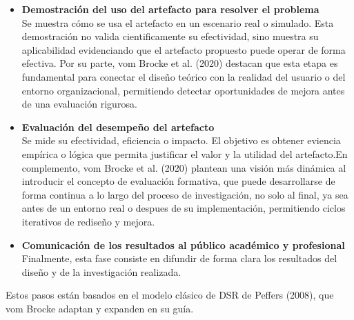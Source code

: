 \begin{itemize}[align=left, label=--]
    \item \textbf{Demostración del uso del artefacto para resolver el problema}\\
    Se muestra cómo se usa el artefacto en un escenario real o simulado. Esta demostración no valida cientificamente su efectividad, sino muestra su aplicabilidad evidenciando que el artefacto propuesto puede operar de forma efectiva. 
    Por su parte, vom Brocke et al. (2020) destacan que esta etapa es fundamental para conectar el diseño teórico con la realidad del usuario o del entorno organizacional, permitiendo detectar oportunidades de mejora antes de una evaluación rigurosa.
    \item \textbf{Evaluación del desempeño del artefacto}\\
    Se mide su efectividad, eficiencia o impacto. El objetivo es obtener eviencia empírica o lógica que permita justificar el valor y la utilidad del artefacto.En complemento, vom Brocke et al. (2020) plantean una visión más dinámica al introducir el concepto de evaluación formativa, que puede desarrollarse de forma continua a lo largo del proceso de investigación, no solo al final, ya sea antes de un entorno real o despues de su implementación,
    permitiendo ciclos iterativos de rediseño y mejora.
    \item \textbf{Comunicación de los resultados al público académico y profesional}\\
    Finalmente, esta fase consiste en difundir de forma clara los resultados del diseño y de la investigación realizada.
\end{itemize}
Estos pasos están basados en el modelo clásico de DSR de Peffers (2008), que vom Brocke adaptan y expanden en su guía.


